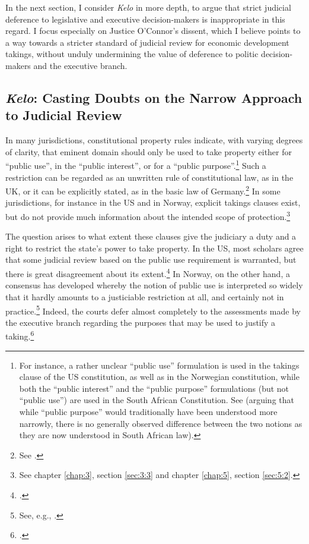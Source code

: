 In the next section, I consider {\it Kelo} in more depth, to argue that strict judicial deference to legislative and executive decision-makers is inappropriate in this regard. I focus especially on Justice O'Connor's dissent, which I believe points to a way towards a stricter standard of judicial review for economic development takings, without unduly undermining the value of deference to politic decision-makers and the executive branch.

\subsection{{\it Kelo}: Casting Doubts on the Narrow Approach to Judicial Review}\label{sec:2:6:1}

In many jurisdictions, constitutional property rules indicate, with varying degrees of clarity, that eminent domain should only be used to take property either for ``public use'', in the ``public interest'', or for a ``public purpose''.\footnote{For instance, a rather unclear ``public use'' formulation is used in the takings clause of the US constitution, as well as in the Norwegian constitution, while both the ``public interest'' and the ``public purpose'' formulations (but not ``public use'') are used in the South African Constitution. See \cite[462]{walt11} (arguing that while ``public purpose'' would traditionally have been understood more narrowly, there is no generally observed difference between the two notions as they are now understood in South African law).} Such a restriction can be regarded as an unwritten rule of constitutional law, as in the UK, or it can be explicitly stated, as in the basic law of Germany.\footnote{See \cite[3-4]{sluysmans15}.} In some jurisdictions, for instance in the US and in Norway, explicit takings clauses exist, but do not provide much information about the intended scope of protection.\footnote{See chapter \ref{chap:3}, section \ref{sec:3:3} and chapter \ref{chap:5}, section \ref{sec:5:2}.}

The question arises to what extent these clauses give the judiciary a duty and a right to restrict the state's power to take property. In the US, most scholars agree that some judicial review based on the public use requirement is warranted, but there is great disagreement about its extent.\footcite[205]{berger78} In Norway, on the other hand, a consensus has developed whereby the notion of public use is interpreted so widely that it hardly amounts to a justiciable restriction at all, and certainly not in practice.\footnote{See, e.g., \cite[368]{aall10}.} Indeed, the courts defer almost completely to the assessments made by the executive branch regarding the purposes that may be used to justify a taking.\footcite[368]{aall10}

